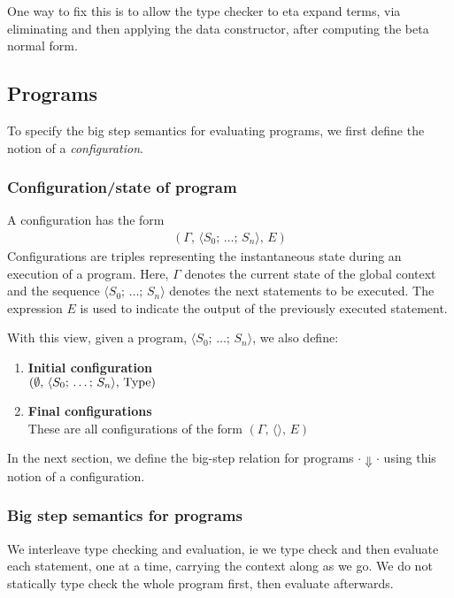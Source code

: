 \documentclass{article}
\begin{document}
One way to fix this is to allow the type checker to eta expand terms, via
eliminating and then applying the data constructor, after
computing the beta normal form.

\subsection{Programs}
To specify the big step semantics for evaluating programs, we first define the
notion of a \textit{configuration}.
\begin{comment}
  Follows this approach:
  https://www.cs.cornell.edu/courses/cs6110/2013sp/lectures/lec05-sp13.pdf
\end{comment}
\subsubsection{Configuration/state of program}
A configuration has the form
\begin{align*}
  (\Gamma, \, \langle S_0; \, \dots; \, S_n \rangle, \, E)
\end{align*}
Configurations are triples representing the instantaneous state during an
execution of a program. Here, $\Gamma$ denotes the current state of the
global context and the sequence $\langle S_0; \, \dots; \, S_n \rangle$ denotes
the next statements to be executed. 
The expression $E$ is used to indicate the output of the previously executed
statement.

With this view, given a program, $\langle S_0; \, \dots; \, S_n
\rangle$, we also define:
\begin{enumerate}
\item \textbf{Initial configuration} \\
  $ (\emptyset, \, \langle S_0; \, \dots; \, S_n \rangle, \, \operatorname{Type})$
\item \textbf{Final configurations} \\
  These are all configurations of the form
  $(\Gamma, \, \langle \rangle, \, E)$
\end{enumerate}

In the next section, we define the big-step relation for programs $\cdot
\Downarrow \cdot$ using
this notion of a configuration.

\subsubsection{Big step semantics for programs}
We interleave type checking and evaluation, ie we type check and then evaluate
each statement, one at a time, carrying the context along as we go.
We do not statically type check the whole program first, then evaluate
afterwards.
\end{document}
